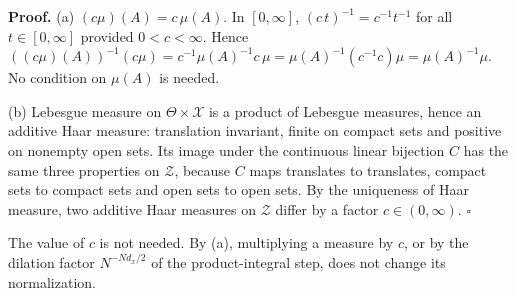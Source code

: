 \documentclass[11pt,a4paper]{article}
\begin{document}
\textbf{Proof.} (a) \((c\mu)(A)=c\,\mu(A)\). In \([0,\infty]\), \((c\,t)^{-1}=c^{-1}t^{-1}\) for all \(t\in[0,\infty]\) provided \(0<c<\infty\). Hence \(((c\mu)(A))^{-1}(c\mu)=c^{-1}\mu(A)^{-1}c\,\mu=\mu(A)^{-1}(c^{-1}c)\mu=\mu(A)^{-1}\mu\). No condition on \(\mu(A)\) is needed.




(b) Lebesgue measure on \(\Theta\times\mathcal X\) is a product of Lebesgue measures, hence an additive Haar measure: translation invariant, finite on compact sets and positive on nonempty open sets. Its image under the continuous linear bijection \(C\) has the same three properties on \(\mathcal Z\), because \(C\) maps translates to translates, compact sets to compact sets and open sets to open sets. By the uniqueness of Haar measure, two additive Haar measures on \(\mathcal Z\) differ by a factor \(c\in(0,\infty)\). \(\square\)




The value of \(c\) is not needed. By (a), multiplying a measure by \(c\), or by the dilation factor \(N^{-Nd_x/2}\) of the product-integral step, does not change its normalization.
\end{document}
